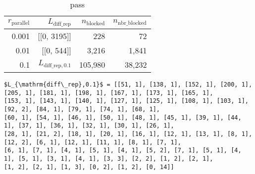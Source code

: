 \documentclass[ijgi,article,submit,moreauthors,pdftex]{Definitions/mdpi}
\begin{document}
\begin{table}[tb]
\centering
\caption{pass}
\begin{tabular}{rrrr}
\hline
$r_\mathrm{parallel}$   & $L_\mathrm{diff\_rep}$        & $n_\mathrm{blocked}$  & $n_\mathrm{nbr\_blocked}$ \\ \hline
0.001                   & [[0, 3195]]                   &       228             &       72                  \\
0.01                    & [[0, 544]]                    &   3{,}216             &  1{,}841                  \\
0.1                     & $L_{\mathrm{diff\_rep}, 0.1}$ & 105{,}980             & 38{,}232                  \\ \hline 
\end{tabular}
\begin{Verbatim}[fontfamily=normal,commandchars=\\\{\},
codes={\catcode`$=3\catcode`^=7\catcode`_=8}]
$L_{\mathrm{diff\_rep},0.1}$ = [[51, 1], [138, 1], [152, 1], [200, 1], [205, 1], [181, 1], [198, 1], [167, 1], [173, 1], [165, 1], 
[153, 1], [143, 1], [140, 1], [127, 1], [125, 1], [108, 1], [103, 1], [92, 2], [84, 1], [79, 1], [74, 1], [68, 1], 
[60, 1], [54, 1], [46, 1], [50, 1], [48, 1], [45, 1], [39, 1], [44, 1], [37, 1], [36, 1], [32, 1], [30, 1], [26, 1], 
[28, 1], [21, 2], [18, 1], [20, 1], [16, 1], [12, 1], [13, 1], [8, 1], [12, 2], [6, 1], [12, 1], [11, 1], [8, 1], [7, 1], 
[6, 1], [7, 1], [4, 1], [5, 1], [4, 1], [5, 2], [7, 1], [5, 1], [4, 1], [5, 1], [3, 1], [4, 1], [3, 3], [2, 2], [1, 2], [2, 1], 
[1, 2], [2, 1], [1, 3], [0, 2], [1, 2], [0, 14]]
\end{Verbatim}
\label{tbl:parallel_param_comparison}
\end{table}
\end{document}
